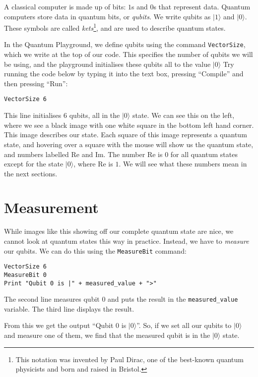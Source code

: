 \documentclass[twocolumn]{article}
\begin{document}
A classical computer is made up of bits: $1$s and $0$s that represent data. Quantum computers store data in quantum bits, or {\em qubits}. We write qubits as $|1\rangle$ and $|0\rangle$. These symbols are called {\em kets}\footnote{This notation was invented by Paul Dirac, one of the best-known quantum physicists and born and raised in Bristol.}, and are used to describe quantum states.

In the Quantum Playground, we define qubits using the command \texttt{VectorSize}, which we write at the top of our code. This specifies the number of qubits we will be using, and the playground initialises these qubits all to the value $|0\rangle$ Try running the code below by typing it into the text box, pressing ``Compile'' and then pressing ``Run'':

\begin{lstlisting}
VectorSize 6
\end{lstlisting}

This line initialises $6$ qubits, all in the $|0\rangle$ state. We can see this on the left, where we see a black image with one white square in the bottom left hand corner. This image describes our state. Each square of this image represents a quantum state, and hovering over a square with the mouse will show us the quantum state, and numbers labelled Re and Im. The number Re is $0$ for all quantum states except for the state $|0\rangle$, where Re is $1$. We will see what these numbers mean in the next sections.

\section{Measurement}

While images like this showing off our complete quantum state are nice, we cannot look at quantum states this way in practice. Instead, we have to {\em measure} our qubits. We can do this using the \texttt{MeasureBit} command:

\begin{lstlisting}
VectorSize 6
MeasureBit 0
Print "Qubit 0 is |" + measured_value + ">"
\end{lstlisting}

The second line measures qubit $0$ and puts the result in the \texttt{measured\_value} variable. The third line displays the result.

From this we get the output ``Qubit $0$ is $|0\rangle$''. So, if we set all our qubits to $|0\rangle$ and measure one of them, we find that the measured qubit is in the $|0\rangle$ state.
\end{document}
